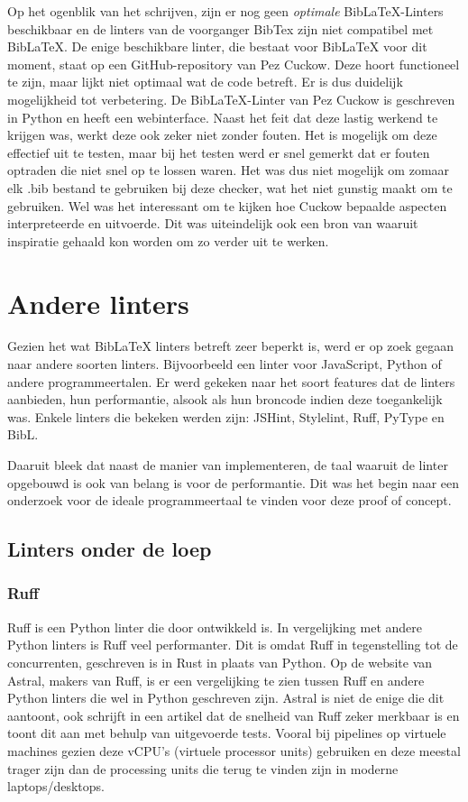 Op het ogenblik van het schrijven, zijn er nog geen \emph{optimale} BibLaTeX-Linters beschikbaar en de linters van de voorganger BibTex zijn niet compatibel met BibLaTeX. De enige beschikbare linter, die bestaat voor BibLaTeX voor dit moment, staat op een GitHub-repository van Pez Cuckow. Deze hoort functioneel te zijn, maar lijkt niet optimaal wat de code betreft. Er is dus duidelijk mogelijkheid tot verbetering. De BibLaTeX-Linter van Pez Cuckow is geschreven in Python en heeft een webinterface.\autocite{Cuckow2022} Naast het feit dat deze lastig werkend te krijgen was, werkt deze ook zeker niet zonder fouten. Het is mogelijk om deze effectief uit te testen, maar bij het testen werd er snel gemerkt dat er fouten optraden die niet snel op te lossen waren. Het was dus niet mogelijk om zomaar elk .bib bestand te gebruiken bij deze checker, wat het niet gunstig maakt om te gebruiken. Wel was het interessant om te kijken hoe Cuckow bepaalde aspecten interpreteerde en uitvoerde. Dit was uiteindelijk ook een bron van waaruit inspiratie gehaald kon worden om zo verder uit te werken.


\section{Andere linters}
Gezien het wat BibLaTeX linters betreft zeer beperkt is, werd er op zoek gegaan naar andere soorten linters. Bijvoorbeeld een linter voor JavaScript, Python of andere programmeertalen. Er werd gekeken naar het soort features dat de linters aanbieden, hun performantie, alsook als hun broncode indien deze toegankelijk was. Enkele linters die bekeken werden zijn: JSHint, Stylelint, Ruff, PyType en BibL.

Daaruit bleek dat naast de manier van implementeren, de taal waaruit de linter opgebouwd is ook van belang is voor de performantie. Dit was het begin naar een onderzoek voor de ideale programmeertaal te vinden voor deze proof of concept. 

\subsection{Linters onder de loep}
\subsubsection{Ruff}
Ruff is een Python linter die door \textcite{Astral2024} ontwikkeld is. In vergelijking met andere Python linters is Ruff veel performanter. Dit is omdat Ruff in tegenstelling tot de concurrenten, geschreven is in Rust in plaats van Python. Op de website van Astral, makers van Ruff, is er een vergelijking te zien tussen Ruff en andere Python linters die wel in Python geschreven zijn. Astral is niet de enige die dit aantoont, ook \textcite{TurnerTrauring2023} schrijft in een artikel dat de snelheid van Ruff zeker merkbaar is en toont dit aan met behulp van uitgevoerde tests. Vooral bij pipelines op virtuele machines gezien deze vCPU's (virtuele processor units) gebruiken en deze meestal trager zijn dan de processing units die terug te vinden zijn in moderne laptops/desktops.

